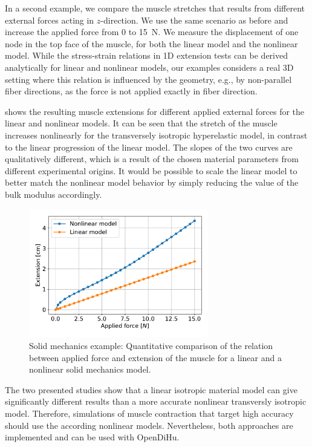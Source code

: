 In a second example, we compare the muscle stretches that results from different external forces acting in $z$-direction.  We use the same scenario as before and increase the applied force from 0 to \SI{15}{\newton}. We measure the displacement of one node in the top face of the muscle, for both the linear model and the nonlinear model. While the stress-strain relations  in 1D extension tests  can be derived analytically for linear and nonlinear models, our examples considers a real 3D setting where this relation is influenced by the geometry, e.g., by non-parallel fiber directions, as the force is not applied exactly in fiber direction.

 shows the resulting muscle extensions for different applied external forces for the linear and nonlinear models.
It can be seen that the stretch of the muscle increases nonlinearly for the transversely isotropic hyperelastic model, in contrast to the linear progression of the linear model.
The slopes of the two curves are qualitatively different, which is a result of the chosen material parameters from different experimental origins. It would be possible to scale the linear model to better match the nonlinear model behavior by simply reducing the value of the bulk modulus accordingly.

\begin{figure}
  \centering%
  \includegraphics[width=0.7\textwidth]{images/results/basic/linear_nonlinear_displacements.pdf}%
  \caption{Solid mechanics example: Quantitative comparison of the relation between applied force and extension of the muscle for a linear and a nonlinear solid mechanics model.}%
  \label{fig:linear_nonlinear_displacements}%
\end{figure}

The two presented studies show that a linear isotropic material model can give significantly different results than a more accurate nonlinear transversly isotropic model. Therefore, simulations of muscle contraction that target high accuracy should use the according nonlinear models. Nevertheless, both approaches are implemented and can be used with OpenDiHu.

